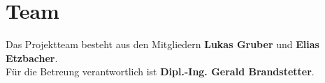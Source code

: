 \section{Team}
Das Projektteam besteht aus den Mitgliedern \textbf{Lukas Gruber} und \textbf{Elias Etzbacher}. \\
Für die Betreung verantwortlich ist \textbf{Dipl.-Ing. Gerald Brandstetter}. \\